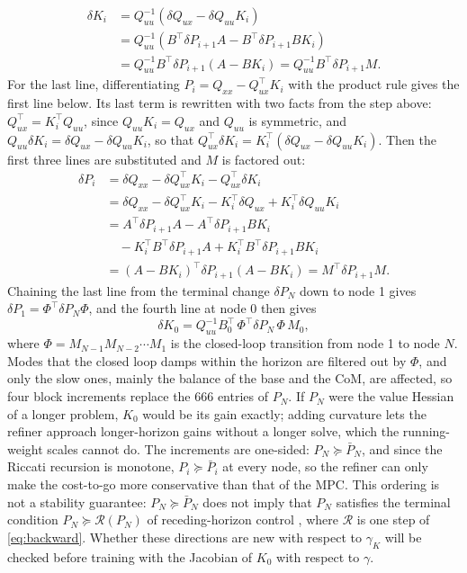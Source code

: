 \documentclass[conference]{IEEEtran}
\newcommand{\T}{^{\top}}
\begin{document}
\[
\begin{aligned}
\delta K_i&=Q_{uu}^{-1}(\delta Q_{ux}-\delta Q_{uu}K_i)\\
&=Q_{uu}^{-1}(B\T\delta P_{i+1}A-B\T\delta P_{i+1}BK_i)\\
&=Q_{uu}^{-1}B\T\delta P_{i+1}(A-BK_i)=Q_{uu}^{-1}B\T\delta P_{i+1}M.
\end{aligned}
\]
For the last line, differentiating $P_i=Q_{xx}-Q_{ux}\T K_i$ with the product rule gives the first line below.
Its last term is rewritten with two facts from the step above: $Q_{ux}\T=K^{\top}_iQ_{uu}$, since $Q_{uu}K_i=Q_{ux}$ and $Q_{uu}$ is symmetric, and $Q_{uu}\delta K_i=\delta Q_{ux}-\delta Q_{uu}K_i$, so that $Q_{ux}\T\delta K_i=K^{\top}_i(\delta Q_{ux}-\delta Q_{uu}K_i)$.
Then the first three lines are substituted and $M$ is factored out:
\[
\begin{aligned}
\delta P_i&=\delta Q_{xx}-\delta Q_{ux}\T K_i-Q_{ux}\T\delta K_i\\
&=\delta Q_{xx}-\delta Q_{ux}\T K_i-K^{\top}_i\delta Q_{ux}+K^{\top}_i\delta Q_{uu}K_i\\
&=A\T\delta P_{i+1}A-A\T\delta P_{i+1}BK_i\\
&\quad-K^{\top}_iB\T\delta P_{i+1}A+K^{\top}_iB\T\delta P_{i+1}BK_i\\
&=(A-BK_i)\T\delta P_{i+1}(A-BK_i)=M\T\delta P_{i+1}M.
\end{aligned}
\]
Chaining the last line from the terminal change $\delta P_N$ down to node 1 gives $\delta P_1=\Phi\T\delta P_N\Phi$, and the fourth line at node 0 then gives
\begin{equation}
\delta K_0=Q_{uu}^{-1}B_0\T\,\Phi\T\delta P_N\,\Phi\,M_0,
\label{eq:dK}
\end{equation}
where $\Phi=M_{N-1}M_{N-2}\cdots M_1$ is the closed-loop transition from node 1 to node $N$.
Modes that the closed loop damps within the horizon are filtered out by $\Phi$, and only the slow ones, mainly the balance of the base and the CoM, are affected, so four block increments replace the 666 entries of $P_N$.
If $P_N$ were the value Hessian of a longer problem, $K_0$ would be its gain exactly; adding curvature lets the refiner approach longer-horizon gains without a longer solve, which the running-weight scales cannot do.
The increments are one-sided: $P_N\succeq \bar P_N$, and since the Riccati recursion is monotone, $P_i\succeq\bar P_i$ at every node, so the refiner can only make the cost-to-go more conservative than that of the MPC.
This ordering is not a stability guarantee: $P_N\succeq \bar P_N$ does not imply that $P_N$ satisfies the terminal condition $P_N\succeq\mathcal R(P_N)$ of receding-horizon control \cite{bitmead1990adaptive}, where $\mathcal R$ is one step of \eqref{eq:backward}.
Whether these directions are new with respect to $\gamma_K$ will be checked before training with the Jacobian of $K_0$ with respect to $\gamma$.
\end{document}
